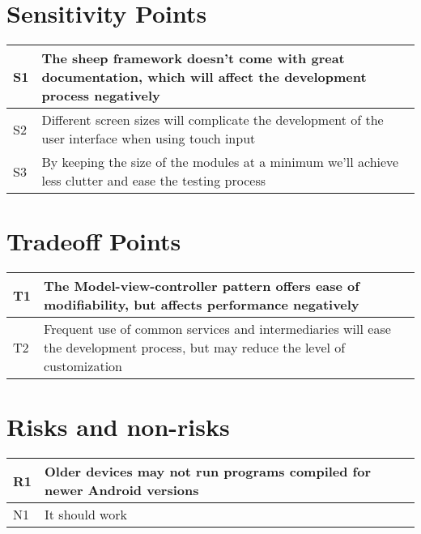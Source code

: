 \section{Sensitivity Points}

\begin{tabular}{|m{}|m{}|}
  \hline
  S1 & The sheep framework doesn't come with great documentation, which will affect the development process negatively \\ \hline
  S2 & Different screen sizes will complicate the development of the user interface when using touch input \\ \hline
  S3 & By keeping the size of the modules at a minimum we'll achieve less clutter and ease the testing process \\ \hline 
\end{tabular}

\section{Tradeoff Points}
\begin{tabular}{|m{}|m{}|}
  \hline
  T1 & The Model-view-controller pattern offers ease of modifiability, but affects performance negatively \\ \hline
  T2 & Frequent use of common services and intermediaries will ease the development process, but may reduce the
  level of customization \\ \hline
\end{tabular}

\section{Risks and non-risks}
\begin{tabular}{|m{}|m{}|}
  \hline
  R1 & Older devices may not run programs compiled for newer Android versions \\ \hline
  N1 & It should work \\ \hline
\end{tabular}
